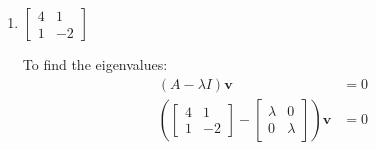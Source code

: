 \documentclass[11pt]{article}
\makeatletter
\newenvironment{amatrix}[1]{%
    \left[\begin{array}{@{}*{#1}{c}|c@{}}
}{%
    \end{array}\right]
}
\makeatother
\begin{document}
\begin{enumerate}[label=\textbf{\arabic*.}, start=3]
{\begin{enumerate}[label=\textbf{(\alph*)}]
{\begin{align*}
                    \begin{bmatrix}-1 & 1 \\ 1 & -1\end{bmatrix}\mathbf{v}&=0
                    \end{align*}
                    \begin{equation*}
                        \begin{amatrix}{2}-1 & 1 & 0 \\ 1 & -1 & 0\end{amatrix}
                        \xrightarrow{R_2+R_1}
                        \begin{amatrix}{2}-1 & 1 & 0 \\ 0 & 0 & 0\end{amatrix}
                    \end{equation*}
                    If \(\mathbf{v}=\begin{bmatrix}v_1 \\ v_2\end{bmatrix}\), the above matrix corresponds to a solution of \(-v_1+v_2=0\), or \(v_1=v_2\). Therefore,
                    \[\mathbf{v}=\begin{bmatrix}v_2 \\ v_2\end{bmatrix}=v_2\begin{bmatrix}1 \\ 1\end{bmatrix}\]
                    and \(\begin{bmatrix}1 \\ 1\end{bmatrix}\) is the eigenvector for \(\lambda=1\).
                    \par
                    This same procedure will be followed for the rest of this question.
                }
                \item{
                    \textbf{\boldmath \(\begin{bmatrix}4 & 1 \\ 1 & -2\end{bmatrix}\)}
                    \par
                    To find the eigenvalues:
                    \begin{align*}
                        (A-\lambda I)\mathbf{v}&=0 \\
                        \left(\begin{bmatrix}4 & 1 \\ 1 & -2\end{bmatrix}-\begin{bmatrix}\lambda & 0 \\ 0 & \lambda\end{bmatrix}\right)\mathbf{v}&=0 \\

\end{align*}}
\end{enumerate}}
\end{enumerate}
\end{document}
